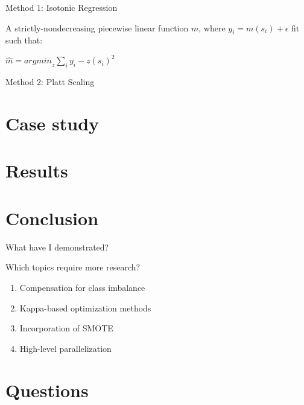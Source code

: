 \documentclass[ignorenonframetext,]{beamer}
\providecommand{\tightlist}{%
\setlength{\itemsep}{0pt}\setlength{\parskip}{0pt}}
\begin{document}
\begin{frame}{Method 1: Isotonic Regression}

A strictly-nondecreasing piecewise linear function \(m\), where
\(y_i = m(s_i) + \epsilon\) fit such that:

\begin{centering}
$\hat{m} = {argmin}_z \sum_i{y_i-z(s_i) ^2}$
\end{centering}

\end{frame}

\begin{frame}{Method 2: Platt Scaling}

\end{frame}

\section{Case study}\label{case-study}

\section{Results}\label{results}

\section{Conclusion}\label{conclusion}

\begin{frame}{What have I demonstrated?}

\end{frame}

\begin{frame}{Which topics require more research?}

\begin{enumerate}
\def\labelenumi{\arabic{enumi}.}
\tightlist
\item
  Compensation for class imbalance
\item
  Kappa-based optimization methods
\item
  Incorporation of SMOTE
\item
  High-level parallelization
\end{enumerate}

\end{frame}

\section{Questions}\label{questions}
\end{document}
